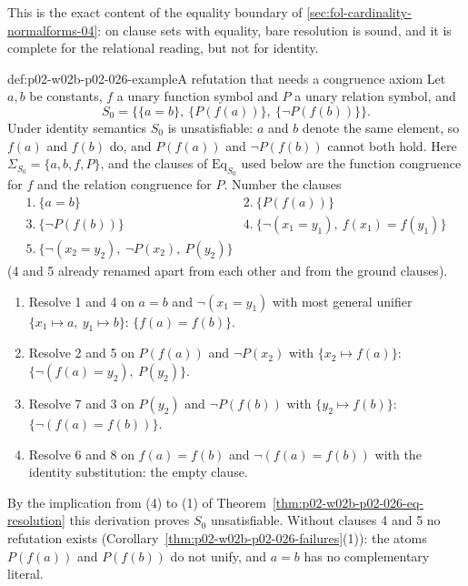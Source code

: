 This is the exact content of the equality boundary of
\cref{sec:fol-cardinality-normalforms-04}: on clause sets with equality,
bare resolution is sound, and it is complete for the relational reading, but
not for identity.

\begin{hbexample}{def:p02-w02b-p02-026-example}{A refutation that needs a congruence axiom}
Let \(a,b\) be constants, \(f\) a unary function symbol and \(P\) a unary
relation symbol, and
\[
 S_0=\bigl\{\{a=b\},\ \{P(f(a))\},\ \{\neg P(f(b))\}\bigr\}.
\]
Under identity semantics \(S_0\) is unsatisfiable: \(a\) and \(b\) denote the
same element, so \(f(a)\) and \(f(b)\) do, and \(P(f(a))\) and
\(\neg P(f(b))\) cannot both hold.  Here \(\Sigma_{S_0}=\{a,b,f,P\}\), and the
clauses of \(\mathrm{Eq}_{S_0}\) used below are the function congruence for
\(f\) and the relation congruence for \(P\).  Number the clauses
\[
 \begin{array}{ll}
  1.\ \{a=b\} & 2.\ \{P(f(a))\}\\
  3.\ \{\neg P(f(b))\} & 4.\ \{\neg(x_1=y_1),\ f(x_1)=f(y_1)\}\\
  5.\ \{\neg(x_2=y_2),\ \neg P(x_2),\ P(y_2)\} &
 \end{array}
\]
(4 and 5 already renamed apart from each other and from the ground clauses).
\begin{enumerate}
  \item[6.] Resolve 1 and 4 on \(a=b\) and \(\neg(x_1=y_1)\) with most
        general unifier \(\{x_1\mapsto a,\ y_1\mapsto b\}\):
        \(\{f(a)=f(b)\}\).
  \item[7.] Resolve 2 and 5 on \(P(f(a))\) and \(\neg P(x_2)\) with
        \(\{x_2\mapsto f(a)\}\): \(\{\neg(f(a)=y_2),\ P(y_2)\}\).
  \item[8.] Resolve 7 and 3 on \(P(y_2)\) and \(\neg P(f(b))\) with
        \(\{y_2\mapsto f(b)\}\): \(\{\neg(f(a)=f(b))\}\).
  \item[9.] Resolve 6 and 8 on \(f(a)=f(b)\) and \(\neg(f(a)=f(b))\) with the
        identity substitution: the empty clause.
\end{enumerate}
By the implication from (4) to (1) of
Theorem~\ref{thm:p02-w02b-p02-026-eq-resolution} this derivation proves
\(S_0\) unsatisfiable.  Without clauses 4 and 5 no refutation exists
(Corollary~\ref{thm:p02-w02b-p02-026-failures}(1)): the atoms \(P(f(a))\)
and \(P(f(b))\) do not unify, and \(a=b\) has no complementary literal.
\end{hbexample}

